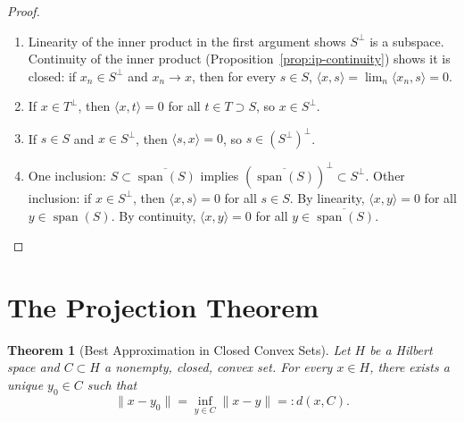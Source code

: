 \documentclass[11pt,a4paper]{article}
\theoremstyle{definition}
\theoremstyle{plain}
\newtheorem{theorem}{Theorem}[section]
\theoremstyle{remark}
\DeclareMathOperator{\spn}{span}
\begin{document}
\begin{proof}
\begin{enumerate}[label=(\roman*)]
    \item Linearity of the inner product in the first argument shows $S^\perp$
          is a subspace. Continuity of the inner product
          (Proposition~\ref{prop:ip-continuity}) shows it is closed:
          if $x_n \in S^\perp$ and $x_n \to x$, then for every $s \in S$,
          $\langle x, s \rangle = \lim_n \langle x_n, s \rangle = 0$.
    \item If $x \in T^\perp$, then $\langle x, t \rangle = 0$ for all $t \in T
          \supset S$, so $x \in S^\perp$.
    \item If $s \in S$ and $x \in S^\perp$, then $\langle s, x \rangle = 0$,
          so $s \in (S^\perp)^\perp$.
    \item One inclusion: $S \subset \overline{\spn(S)}$ implies
          $(\overline{\spn(S)})^\perp \subset S^\perp$.
          Other inclusion: if $x \in S^\perp$, then $\langle x, s \rangle = 0$
          for all $s \in S$. By linearity, $\langle x, y \rangle = 0$ for all
          $y \in \spn(S)$. By continuity, $\langle x, y \rangle = 0$ for all
          $y \in \overline{\spn(S)}$. \qedhere
\end{enumerate}
\end{proof}


\section{The Projection Theorem}\label{sec:projection}

\begin{theorem}[Best Approximation in Closed Convex Sets]\label{thm:best-approx}
Let $H$ be a Hilbert space and $C \subset H$ a nonempty, closed, convex set.
For every $x \in H$, there exists a unique $y_0 \in C$ such that
\[
    \|x - y_0\| = \inf_{y \in C} \|x - y\| =: d(x, C).
\]
\end{theorem}
\end{document}
